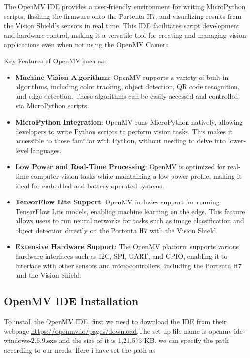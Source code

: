 The OpenMV IDE provides a user-friendly environment for writing MicroPython scripts, flashing the firmware onto the Portenta H7, and visualizing results from the Vision Shield's sensors in real time. This IDE facilitates script development and hardware control, making it a versatile tool for creating and managing vision applications even when not using the OpenMV Camera. \cite{openmv_docs:2024}

Key Features of OpenMV such as:
\begin{itemize} 
	\item \textbf{Machine Vision Algorithms}: OpenMV supports a variety of built-in algorithms, including color tracking, object detection, QR code recognition, and edge detection. These algorithms can be easily accessed and controlled via MicroPython scripts. 
	\item \textbf{MicroPython Integration}: OpenMV runs MicroPython natively, allowing developers to write Python scripts to perform vision tasks. This makes it accessible to those familiar with Python, without needing to delve into lower-level languages.
	\item \textbf{Low Power and Real-Time Processing}: OpenMV is optimized for real-time computer vision tasks while maintaining a low power profile, making it ideal for embedded and battery-operated systems. 
	\item \textbf{TensorFlow Lite Support}: OpenMV includes support for running TensorFlow Lite models, enabling machine learning on the edge. This feature allows users to run neural networks for tasks such as image classification and object detection directly on the Portenta H7 with the Vision Shield. 
	\item \textbf{Extensive Hardware Support}: The OpenMV platform supports various hardware interfaces such as I2C, SPI, UART, and GPIO, enabling it to interface with other sensors and microcontrollers, including the Portenta H7 and the Vision Shield. 
\end{itemize}



\subsection{OpenMV IDE Installation}

To install the OpenMV IDE, first we need to download the IDE from their webpage \url{https://openmv.io/pages/download}.The set up file name is openmv-ide-windows-2.6.9.exe and the size of it is 1,21,573 KB. we can specify the path according to our needs. Here i have set the path as 

